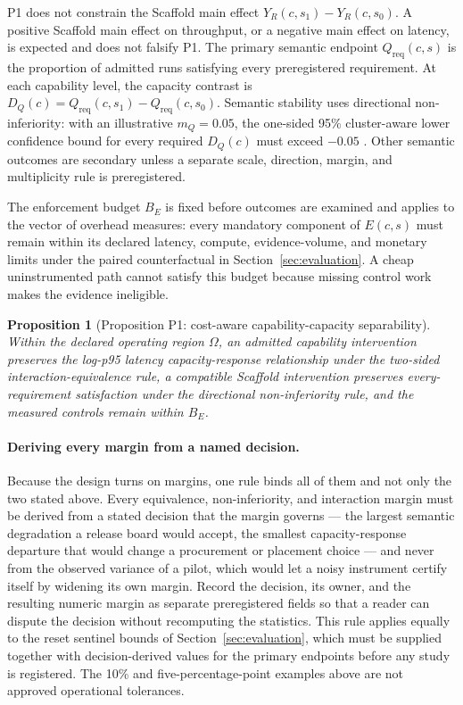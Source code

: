 \documentclass[11pt]{article}
\newtheorem{proposition}{Proposition}
\begin{document}
P1 does not constrain the Scaffold main effect $Y_R(c,s_1)-Y_R(c,s_0)$. A positive Scaffold main effect on throughput, or a negative main effect on latency, is expected and does not falsify P1. The primary semantic endpoint $Q_{\mathrm{req}}(c,s)$ is the proportion of admitted runs satisfying every preregistered requirement. At each capability level, the capacity contrast is $D_Q(c)=Q_{\mathrm{req}}(c,s_1)-Q_{\mathrm{req}}(c,s_0)$. Semantic stability uses directional non-inferiority: with an illustrative $m_Q=0.05$, the one-sided 95\% cluster-aware lower confidence bound for every required $D_Q(c)$ must exceed $-0.05$ \cite{piaggio2012noninferiority}. Other semantic outcomes are secondary unless a separate scale, direction, margin, and multiplicity rule is preregistered.

The enforcement budget $B_E$ is fixed before outcomes are examined and applies to the vector of overhead measures: every mandatory component of $E(c,s)$ must remain within its declared latency, compute, evidence-volume, and monetary limits under the paired counterfactual in Section~\ref{sec:evaluation}. A cheap uninstrumented path cannot satisfy this budget because missing control work makes the evidence ineligible.

\begin{proposition}[Proposition P1: cost-aware capability-capacity separability]
\label{prop:p1}
Within the declared operating region $\Omega$, an admitted capability intervention preserves the log-p95 latency capacity-response relationship under the two-sided interaction-equivalence rule, a compatible Scaffold intervention preserves every-requirement satisfaction under the directional non-inferiority rule, and the measured controls remain within $B_E$.
\end{proposition}

\paragraph{Deriving every margin from a named decision.}
Because the design turns on margins, one rule binds all of them and not only the two stated above. Every equivalence, non-inferiority, and interaction margin must be derived from a stated decision that the margin governs --- the largest semantic degradation a release board would accept, the smallest capacity-response departure that would change a procurement or placement choice --- and never from the observed variance of a pilot, which would let a noisy instrument certify itself by widening its own margin. Record the decision, its owner, and the resulting numeric margin as separate preregistered fields so that a reader can dispute the decision without recomputing the statistics. This rule applies equally to the reset sentinel bounds of Section~\ref{sec:evaluation}, which must be supplied together with decision-derived values for the primary endpoints before any study is registered. The 10\% and five-percentage-point examples above are not approved operational tolerances.
\end{document}
